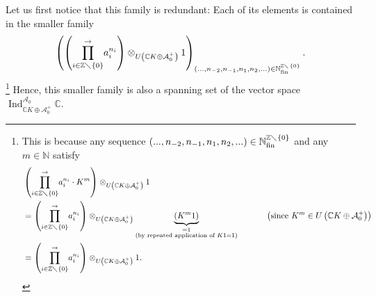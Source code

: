 \documentclass
[numbers=enddot,12pt,final,onecolumn,german,notitlepage]{scrartcl}%
\theoremstyle{definition}
\begin{document}
Let us first notice that this family is redundant: Each of its elements is
contained in the smaller family%
\[
\left(  \left(  \overset{\rightarrow}{\prod\limits_{i\in\mathbb{Z}%
\diagdown\left\{  0\right\}  }}a_{i}^{n_{i}}\right)  \otimes_{U\left(
\mathbb{C}K\oplus\mathcal{A}_{0}^{+}\right)  }1\right)  _{\left(
...,n_{-2},n_{-1},n_{1},n_{2},...\right)  \in\mathbb{N}_{\operatorname*{fin}%
}^{\mathbb{Z}\diagdown\left\{  0\right\}  }}.
\]
\footnote{This is because any sequence $\left(  ...,n_{-2},n_{-1},n_{1}%
,n_{2},...\right)  \in\mathbb{N}_{\operatorname*{fin}}^{\mathbb{Z}%
\diagdown\left\{  0\right\}  }$ and any $m\in\mathbb{N}$ satisfy%
\begin{align*}
&  \left(  \overset{\rightarrow}{\prod\limits_{i\in\mathbb{Z}\diagdown\left\{
0\right\}  }}a_{i}^{n_{i}}\cdot K^{m}\right)  \otimes_{U\left(  \mathbb{C}%
K\oplus\mathcal{A}_{0}^{+}\right)  }1\\
&  =\left(  \overset{\rightarrow}{\prod\limits_{i\in\mathbb{Z}\diagdown
\left\{  0\right\}  }}a_{i}^{n_{i}}\right)  \otimes_{U\left(  \mathbb{C}%
K\oplus\mathcal{A}_{0}^{+}\right)  }\underbrace{\left(  K^{m}1\right)
}_{\substack{=1\\\text{(by repeated application of }K1=1\text{)}%
}}\ \ \ \ \ \ \ \ \ \ \left(  \text{since }K^{m}\in U\left(  \mathbb{C}%
K\oplus\mathcal{A}_{0}^{+}\right)  \right) \\
&  =\left(  \overset{\rightarrow}{\prod\limits_{i\in\mathbb{Z}\diagdown
\left\{  0\right\}  }}a_{i}^{n_{i}}\right)  \otimes_{U\left(  \mathbb{C}%
K\oplus\mathcal{A}_{0}^{+}\right)  }1.
\end{align*}
} Hence, this smaller family is also a spanning set of the vector space
$\operatorname*{Ind}\nolimits_{\mathbb{C}K\oplus\mathcal{A}_{0}^{+}%
}^{\mathcal{A}_{0}}\mathbb{C}$.
\end{document}

